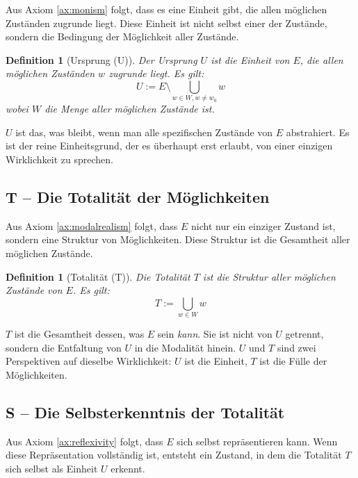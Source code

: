 \documentclass[12pt,a4paper]{article}
\newtheorem{definition}[theorem]{Definition}
\begin{document}
Aus Axiom \ref{ax:monism} folgt, dass es eine Einheit gibt, die allen möglichen Zuständen zugrunde liegt. Diese Einheit ist nicht selbst einer der Zustände, sondern die Bedingung der Möglichkeit aller Zustände.

\begin{definition}[Ursprung (U)]
\label{def:origin}
Der Ursprung \(U\) ist die Einheit von \(E\), die allen möglichen Zuständen \(w\) zugrunde liegt. Es gilt:
\begin{equation}
U := E \setminus \bigcup_{w \in W, w \neq w_0} w
\end{equation}
wobei \(W\) die Menge aller möglichen Zustände ist.
\end{definition}

\(U\) ist das, was bleibt, wenn man alle spezifischen Zustände von \(E\) abstrahiert. Es ist der reine Einheitsgrund, der es überhaupt erst erlaubt, von einer einzigen Wirklichkeit zu sprechen.

\subsection{T – Die Totalität der Möglichkeiten}

Aus Axiom \ref{ax:modalrealism} folgt, dass \(E\) nicht nur ein einziger Zustand ist, sondern eine Struktur von Möglichkeiten. Diese Struktur ist die Gesamtheit aller möglichen Zustände.

\begin{definition}[Totalität (T)]
\label{def:totality}
Die Totalität \(T\) ist die Struktur aller möglichen Zustände von \(E\). Es gilt:
\begin{equation}
T := \bigcup_{w \in W} w
\end{equation}
\end{definition}

\(T\) ist die Gesamtheit dessen, was \(E\) sein \emph{kann}. Sie ist nicht von \(U\) getrennt, sondern die Entfaltung von \(U\) in die Modalität hinein. \(U\) und \(T\) sind zwei Perspektiven auf dieselbe Wirklichkeit: \(U\) ist die Einheit, \(T\) ist die Fülle der Möglichkeiten.

\subsection{S – Die Selbsterkenntnis der Totalität}

Aus Axiom \ref{ax:reflexivity} folgt, dass \(E\) sich selbst repräsentieren kann. Wenn diese Repräsentation vollständig ist, entsteht ein Zustand, in dem die Totalität \(T\) sich selbst als Einheit \(U\) erkennt.
\end{document}
